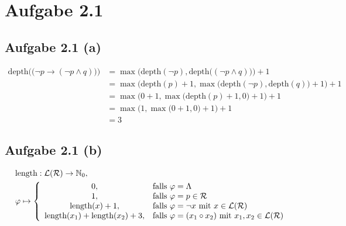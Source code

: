 \documentclass[12pt,a4paper]{article}
\author{Willi Sontopski}
\newcommand{\depth}{\text{depth}}
\newcommand{\length}{\text{length}}
\begin{document}

\section*{Aufgabe 2.1}
\subsection*{Aufgabe 2.1 (a)}
\begin{align*}
\depth\Big(\big(\neg p\to(\neg p\wedge q)\big)\Big)
&=\max\Big(\depth(\neg p),\depth\big((\neg p\wedge q)\big)\Big)+1\\
&=\max\Big(\depth(p)+1,\max\big(\depth(\neg p),\depth(q)\big)+1\Big)+1\\
&=\max\Big(0+1,\max\big(\depth(p)+1,0\big)+1\Big)+1\\
&=\max\Big(1,\max\big(0+1,0\big)+1\Big)+1\\
&=3
\end{align*}

\subsection*{Aufgabe 2.1 (b)}
\begin{align*}
&\length:\mathcal{L}(\mathcal{R})\to\N_0,\qquad\\
&\varphi\mapsto\left\lbrace\begin{array}{cl}
0, & \falls \varphi=\Lambda\\
1, & \falls \varphi=p\in\mathcal{R}\\
\length(x) + 1, & \falls \varphi=\neg x\mit x\in\mathcal{L}(\mathcal{R})\\
\length(x_1) + \length(x_2) + 3, & \falls \varphi=(x_1\circ x_2)\mit x_1,x_2\in\mathcal{L}(\mathcal{R})%
\end{array}\right.
\end{align*}
\end{document}
